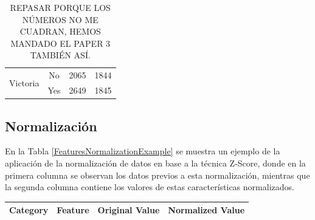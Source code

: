 \documentclass{uathesis-es}
\begin{document}
{\begin{table}[H]
\begin{center}
\begin{tabular}{|c|c||c|c|}
        \multirow{2}{*}{Victoria} &
            No   & 2065  & 1844  \\ &
            Yes  & 2649  & 1845 \\ \hline \hline
		\end{tabular}
	\end{center}
	\caption{REPASAR PORQUE LOS NÚMEROS NO ME CUADRAN, HEMOS MANDADO EL PAPER 3 TAMBIÉN ASÍ.}
	\label{Resampling}
\end{table}


\subsection{Normalización}

En la Tabla \ref{FeaturesNormalizationExample} se muestra un ejemplo de la aplicación de la normalización de datos en base a la técnica Z-Score, donde en la primera columna se observan los datos previos a esta normalización, mientras que la segunda columna contiene los valores de estas características normalizados.

\begin{table}[H]
	\begin{center}
		\begin{tabular}{|c|c||c|c|}
		\hline

		\textbf{Category} & \textbf{Feature} & \textbf{Original Value} & \textbf{Normalized Value}
		\\ \hline \hline


\end{tabular}
\end{center}
\end{table}}
\end{document}
